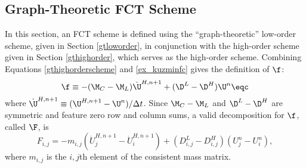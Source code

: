 \subsection{Graph-Theoretic FCT Scheme}\label{gtFCT}
In this section, an FCT scheme is defined using the ``graph-theoretic'' low-order
scheme, given in Section \ref{gtloworder}, in conjunction with the
high-order scheme given in Section \ref{gthighorder}, which serves as the
high-order scheme. Combining Equations \eqref{gthighorderscheme} and
\eqref{ex_kuzminfc} gives the definition of $\f$:
\begin{equation}\label{gtf}
   \f \equiv -(\M_C-\M_L)\dot{\U}^{H,n+1} + (\D^L-\D^H)\U^n \eqc
\end{equation}
where $\dot{\U}^{H,n+1} \equiv (\U^{H,n+1} - \U^n)/\Delta t$.
Since $\M_C-\M_L$ and $\D^L-\D^H$ are symmetric
and feature zero row and column sums, a valid decomposition for $\f$,
called $\F$, is
\begin{equation}
   F_{i,j} = -m_{i,j}(\dot{U}^{H,n+1}_j - \dot{U}^{H,n+1}_i)
   + (D_{i,j}^L-D_{i,j}^H)(U^n_j - U^n_i),
\end{equation}
where $m_{i,j}$ is the $i,j$th element of the consistent mass matrix.
